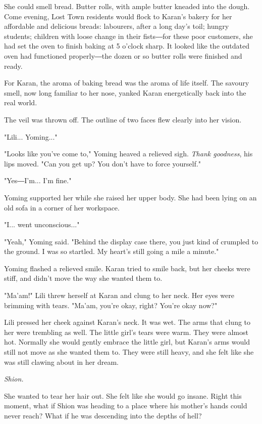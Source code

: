She could smell bread. Butter rolls, with ample butter kneaded into the
dough. Come evening, Lost Town residents would flock to Karan's bakery
for her affordable and delicious breads: labourers, after a long day's
toil; hungry students; children with loose change in their fists―for
these poor customers, she had set the oven to finish baking at 5 o'clock
sharp. It looked like the outdated oven had functioned properly―the
dozen or so butter rolls were finished and ready.

For Karan, the aroma of baking bread was the aroma of life itself. The
savoury smell, now long familiar to her nose, yanked Karan energetically
back into the real world.

The veil was thrown off. The outline of two faces flew clearly into her
vision.

"Lili... Yoming..."

"Looks like you've come to," Yoming heaved a relieved sigh. \emph{Thank
goodness}, his lips moved. "Can you get up? You don't have to force
yourself."

"Yes―I'm... I'm fine."

Yoming supported her while she raised her upper body. She had been lying
on an old sofa in a corner of her workspace.

"I... went unconscious..."

"Yeah," Yoming said. "Behind the display case there, you just kind of
crumpled to the ground. I was so startled. My heart's still going a mile
a minute."

Yoming flashed a relieved smile. Karan tried to smile back, but her
cheeks were stiff, and didn't move the way she wanted them to.

"Ma'am!" Lili threw herself at Karan and clung to her neck. Her eyes
were brimming with tears. "Ma'am, you're okay, right? You're okay now?"

Lili pressed her cheek against Karan's neck. It was wet. The arms that
clung to her were trembling as well. The little girl's tears were warm.
They were almost hot. Normally she would gently embrace the little girl,
but Karan's arms would still not move as she wanted them to. They were
still heavy, and she felt like she was still clawing about in her dream.

\emph{Shion.}

She wanted to tear her hair out. She felt like she would go insane.
Right this moment, what if Shion was heading to a place where his
mother's hands could never reach? What if he was descending into the
depths of hell?

